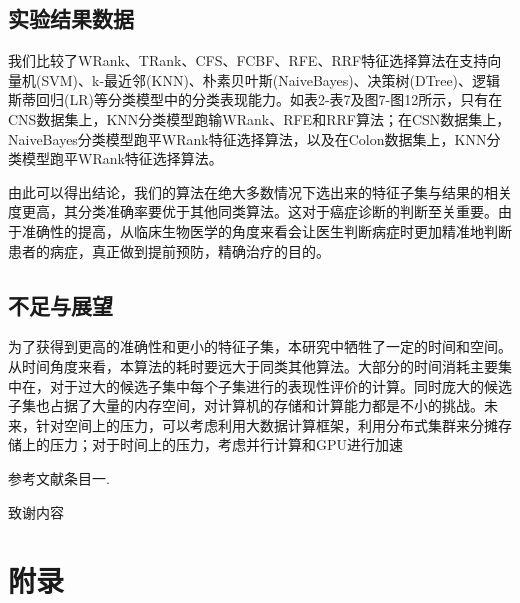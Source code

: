 \documentclass{njubachelor}
\begin{document}
\subsection{实验结果数据}

我们比较了WRank、TRank、CFS、FCBF、RFE、RRF特征选择算法在支持向量机(SVM)、k-最近邻(KNN)、朴素贝叶斯(NaiveBayes)、决策树(DTree)、逻辑斯蒂回归(LR)等分类模型中的分类表现能力。如表2-表7及图7-图12所示，只有在CNS数据集上，KNN分类模型跑输WRank、RFE和RRF算法；在CSN数据集上，NaiveBayes分类模型跑平WRank特征选择算法，以及在Colon数据集上，KNN分类模型跑平WRank特征选择算法。

由此可以得出结论，我们的算法在绝大多数情况下选出来的特征子集与结果的相关度更高，其分类准确率要优于其他同类算法。这对于癌症诊断的判断至关重要。由于准确性的提高，从临床生物医学的角度来看会让医生判断病症时更加精准地判断患者的病症，真正做到提前预防，精确治疗的目的。



\subsection{不足与展望}
  为了获得到更高的准确性和更小的特征子集，本研究中牺牲了一定的时间和空间。从时间角度来看，本算法的耗时要远大于同类其他算法。大部分的时间消耗主要集中在，对于过大的候选子集中每个子集进行的表现性评价的计算。同时庞大的候选子集也占据了大量的内存空间，对计算机的存储和计算能力都是不小的挑战。未来，针对空间上的压力，可以考虑利用大数据计算框架，利用分布式集群来分摊存储上的压力；对于时间上的压力，考虑并行计算和GPU进行加速


\newpage
{}

\begin{thebibliography}{99}
 参考文献条目一.
\end{thebibliography}

\newpage
\ack

致谢内容

\newpage
\appendix

\section{附录}
\end{document}
